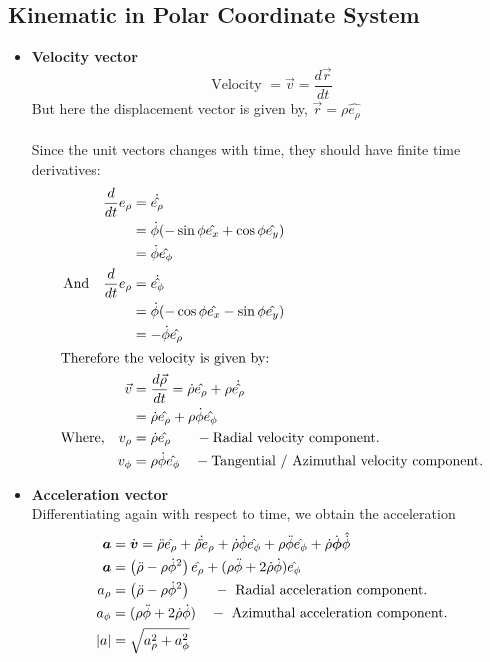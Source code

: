 \subsection{Kinematic in Polar Coordinate System}
\begin{itemize}
	\item {\textbf{Velocity vector}}
	\begin{equation*}
	\text{Velocity }=\vec{v}=\frac{d \vec{r}}{d t}
	\end{equation*}
	But here the displacement vector is given by, $\vec{r}=\rho \hat{e_{\rho}}$
	\\\\Since the unit vectors  changes with time, they should have finite time derivatives:
	\begin{align*}
	\frac{d }{dt} e_{\rho}&=\dot{\hat{e_{\rho}}}\\&=\dot{\phi}(-\sin \phi \hat{e_{x}}+\cos \phi \hat{e_{y}})\\&=\dot{\phi} \hat{e_{\phi}}\\
	\text{And}\quad	\frac{d }{dt} e_{\rho}&=  \dot{\hat{e_{\phi}}}\\&=\dot{\phi}(-\cos \phi \hat{e_{x}}-\sin \phi \hat{e_{y}})\\&=-\dot{\phi} \hat{e_{\rho}}\\
	\intertext{Therefore the velocity is given by:}
	\vec{v}&=\frac{d \vec{\rho}}{d t}=\dot{\rho} \hat{e_{\rho}}+\rho \dot{\hat{e_{\rho}}}\\&=\dot{\rho} \hat{e_{\rho}}+\rho \dot{\phi} \hat{e_{\phi}}\\
	\text{Where,}\quad v_{\rho}&=\dot{\rho} \hat{e_{\rho}} \hspace{0.62cm} -\text{Radial velocity component.}\\
	v_{\phi}&=\rho \dot{\phi} \hat{e_{\phi}}\quad -\text{Tangential / Azimuthal velocity component.}
	\end{align*}
	
	\item{\textbf{Acceleration vector}}\\
	Differentiating again with respect to time, we obtain the acceleration
	\begin{align*}
	\boldsymbol{a}&=\dot{\boldsymbol{v}}=\ddot{\rho} \hat{e_{\rho}}+\dot{\rho} \dot\hat{e_{\rho}}+\dot{\rho} \dot{\phi} \hat{e_{\phi}}+\rho \ddot{\phi} \hat{e_{\phi}}+\dot{\rho} \dot{\boldsymbol{\phi}} \hat{\dot{\phi}}\\
	\boldsymbol{a}&=\left(\ddot{\rho}-\rho \dot{\phi}^{2}\right) \hat{e_{\rho}}+(\rho \ddot{\phi}+2 \dot{\rho} \dot{\phi}) \hat{e_{\phi}}\\
	a_{\rho}&=\left(\ddot{\rho}-\rho \dot{\phi}^{2}\right) \hspace{0.62cm}-\text{ Radial acceleration component.}\\
	a_{\phi}&=(\rho \ddot{\phi}+2 \dot{\rho} \dot{\phi})\quad -\text{ Azimuthal acceleration component.}\\
	|a|&=\sqrt{a_{\rho}^{2}+a_{\phi}^{2}}
	\end{align*}
	
\end{itemize}
